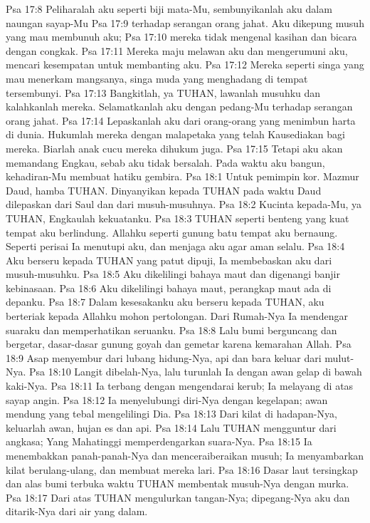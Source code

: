 Psa 17:8  Peliharalah aku seperti biji mata-Mu, sembunyikanlah aku dalam naungan sayap-Mu
Psa 17:9  terhadap serangan orang jahat. Aku dikepung musuh yang mau membunuh aku;
Psa 17:10  mereka tidak mengenal kasihan dan bicara dengan congkak.
Psa 17:11  Mereka maju melawan aku dan mengerumuni aku, mencari kesempatan untuk membanting aku.
Psa 17:12  Mereka seperti singa yang mau menerkam mangsanya, singa muda yang menghadang di tempat tersembunyi.
Psa 17:13  Bangkitlah, ya TUHAN, lawanlah musuhku dan kalahkanlah mereka. Selamatkanlah aku dengan pedang-Mu terhadap serangan orang jahat.
Psa 17:14  Lepaskanlah aku dari orang-orang yang menimbun harta di dunia. Hukumlah mereka dengan malapetaka yang telah Kausediakan bagi mereka. Biarlah anak cucu mereka dihukum juga.
Psa 17:15  Tetapi aku akan memandang Engkau, sebab aku tidak bersalah. Pada waktu aku bangun, kehadiran-Mu membuat hatiku gembira.
Psa 18:1  Untuk pemimpin kor. Mazmur Daud, hamba TUHAN. Dinyanyikan kepada TUHAN pada waktu Daud dilepaskan dari Saul dan dari musuh-musuhnya.
Psa 18:2  Kucinta kepada-Mu, ya TUHAN, Engkaulah kekuatanku.
Psa 18:3  TUHAN seperti benteng yang kuat tempat aku berlindung. Allahku seperti gunung batu tempat aku bernaung. Seperti perisai Ia menutupi aku, dan menjaga aku agar aman selalu.
Psa 18:4  Aku berseru kepada TUHAN yang patut dipuji, Ia membebaskan aku dari musuh-musuhku.
Psa 18:5  Aku dikelilingi bahaya maut dan digenangi banjir kebinasaan.
Psa 18:6  Aku dikelilingi bahaya maut, perangkap maut ada di depanku.
Psa 18:7  Dalam kesesakanku aku berseru kepada TUHAN, aku berteriak kepada Allahku mohon pertolongan. Dari Rumah-Nya Ia mendengar suaraku dan memperhatikan seruanku.
Psa 18:8  Lalu bumi berguncang dan bergetar, dasar-dasar gunung goyah dan gemetar karena kemarahan Allah.
Psa 18:9  Asap menyembur dari lubang hidung-Nya, api dan bara keluar dari mulut-Nya.
Psa 18:10  Langit dibelah-Nya, lalu turunlah Ia dengan awan gelap di bawah kaki-Nya.
Psa 18:11  Ia terbang dengan mengendarai kerub; Ia melayang di atas sayap angin.
Psa 18:12  Ia menyelubungi diri-Nya dengan kegelapan; awan mendung yang tebal mengelilingi Dia.
Psa 18:13  Dari kilat di hadapan-Nya, keluarlah awan, hujan es dan api.
Psa 18:14  Lalu TUHAN mengguntur dari angkasa; Yang Mahatinggi memperdengarkan suara-Nya.
Psa 18:15  Ia menembakkan panah-panah-Nya dan menceraiberaikan musuh; Ia menyambarkan kilat berulang-ulang, dan membuat mereka lari.
Psa 18:16  Dasar laut tersingkap dan alas bumi terbuka waktu TUHAN membentak musuh-Nya dengan murka.
Psa 18:17  Dari atas TUHAN mengulurkan tangan-Nya; dipegang-Nya aku dan ditarik-Nya dari air yang dalam.
